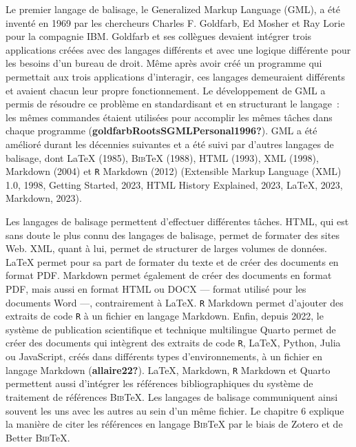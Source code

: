 \documentclass[
  letterpaper,
  DIV=11,
  numbers=noendperiod]{scrreprt}
\begin{document}
Le premier langage de balisage, le Generalized Markup Language (GML), a
été inventé en 1969 par les chercheurs Charles F. Goldfarb, Ed Mosher et
Ray Lorie pour la compagnie IBM. Goldfarb et ses collègues devaient
intégrer trois applications créées avec des langages différents et avec
une logique différente pour les besoins d'un bureau de droit. Même après
avoir créé un programme qui permettait aux trois applications
d'interagir, ces langages demeuraient différents et avaient chacun leur
propre fonctionnement. Le développement de GML a permis de résoudre ce
problème en standardisant et en structurant le langage~: les mêmes
commandes étaient utilisées pour accomplir les mêmes tâches dans chaque
programme (\textbf{goldfarbRootsSGMLPersonal1996?}). GML a été amélioré
durant les décennies suivantes et a été suivi par d'autres langages de
balisage, dont LaTeX (1985), \textsc{Bib}TeX (1988), HTML (1993), XML
(1998), Markdown (2004) et \texttt{R} Markdown (2012) (Extensible
{Markup Language} ({XML}) 1.0, 1998, Getting {Started}, 2023, {HTML
History} \textbar{} {Explained}, 2023, {LaTeX}, 2023, Markdown, 2023).

Les langages de balisage permettent d'effectuer différentes tâches.
HTML, qui est sans doute le plus connu des langages de balisage, permet
de formater des sites Web. XML, quant à lui, permet de structurer de
larges volumes de données. LaTeX permet pour sa part de formater du
texte et de créer des documents en format PDF. Markdown permet également
de créer des documents en format PDF, mais aussi en format HTML ou DOCX
--- format utilisé pour les documents Word ---, contrairement à LaTeX.
\texttt{R} Markdown permet d'ajouter des extraits de code \texttt{R} à
un fichier en langage Markdown. Enfin, depuis 2022, le système de
publication scientifique et technique multilingue Quarto permet de créer
des documents qui intègrent des extraits de code \texttt{R}, LaTeX,
Python, Julia ou JavaScript, créés dans différents types
d'environnements, à un fichier en langage Markdown
(\textbf{allaire22?}). LaTeX, Markdown, \texttt{R} Markdown et Quarto
permettent aussi d'intégrer les références bibliographiques du système
de traitement de références \textsc{Bib}TeX. Les langages de balisage
communiquent ainsi souvent les uns avec les autres au sein d'un même
fichier. Le chapitre 6 explique la manière de citer les références en
langage \textsc{Bib}TeX par le biais de Zotero et de Better
\textsc{Bib}TeX.
\end{document}
